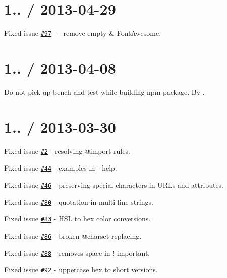 \section*{1.. / 2013-\/04-\/29 }


\begin{DoxyItemize}
\item Fixed issue \href{https://github.com/jakubpawlowicz/clean-css/issues/97}{\tt \#97} -\/ {\ttfamily -\/-\/remove-\/empty} \& Font\+Awesome.
\end{DoxyItemize}

\section*{1.. / 2013-\/04-\/08 }


\begin{DoxyItemize}
\item Do not pick up {\ttfamily bench} and {\ttfamily test} while building {\ttfamily npm} package. By \href{https://https://github.com/sindresorhus}{\tt }.
\end{DoxyItemize}

\section*{1.. / 2013-\/03-\/30 }


\begin{DoxyItemize}
\item Fixed issue \href{https://github.com/jakubpawlowicz/clean-css/issues/2}{\tt \#2} -\/ resolving {\ttfamily @import} rules.
\item Fixed issue \href{https://github.com/jakubpawlowicz/clean-css/issues/44}{\tt \#44} -\/ examples in {\ttfamily -\/-\/help}.
\item Fixed issue \href{https://github.com/jakubpawlowicz/clean-css/issues/46}{\tt \#46} -\/ preserving special characters in U\+R\+Ls and attributes.
\item Fixed issue \href{https://github.com/jakubpawlowicz/clean-css/issues/80}{\tt \#80} -\/ quotation in multi line strings.
\item Fixed issue \href{https://github.com/jakubpawlowicz/clean-css/issues/83}{\tt \#83} -\/ H\+SL to hex color conversions.
\item Fixed issue \href{https://github.com/jakubpawlowicz/clean-css/issues/86}{\tt \#86} -\/ broken {\ttfamily @charset} replacing.
\item Fixed issue \href{https://github.com/jakubpawlowicz/clean-css/issues/88}{\tt \#88} -\/ removes space in {\ttfamily ! important}.
\item Fixed issue \href{https://github.com/jakubpawlowicz/clean-css/issues/92}{\tt \#92} -\/ uppercase hex to short versions.
\end{DoxyItemize}


